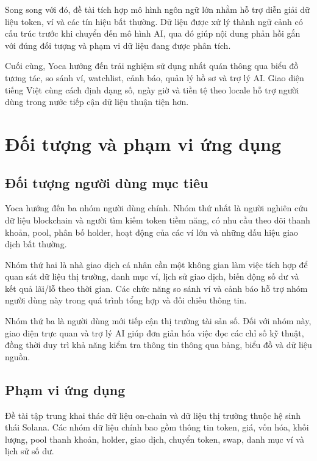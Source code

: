 Song song với đó, đề tài tích hợp mô hình ngôn ngữ lớn nhằm hỗ trợ diễn giải dữ liệu token, ví và các tín hiệu bất thường. Dữ liệu được xử lý thành ngữ cảnh có cấu trúc trước khi chuyển đến mô hình AI, qua đó giúp nội dung phản hồi gắn với đúng đối tượng và phạm vi dữ liệu đang được phân tích.

Cuối cùng, Yoca hướng đến trải nghiệm sử dụng nhất quán thông qua biểu đồ tương tác, so sánh ví, watchlist, cảnh báo, quản lý hồ sơ và trợ lý AI. Giao diện tiếng Việt cùng cách định dạng số, ngày giờ và tiền tệ theo locale hỗ trợ người dùng trong nước tiếp cận dữ liệu thuận tiện hơn.

\section{Đối tượng và phạm vi ứng dụng}
\label{sec:doi_tuong_pham_vi}

\subsection{Đối tượng người dùng mục tiêu}

Yoca hướng đến ba nhóm người dùng chính. Nhóm thứ nhất là người nghiên cứu dữ liệu blockchain và người tìm kiếm token tiềm năng, có nhu cầu theo dõi thanh khoản, pool, phân bố holder, hoạt động của các ví lớn và những dấu hiệu giao dịch bất thường.

Nhóm thứ hai là nhà giao dịch cá nhân cần một không gian làm việc tích hợp để quan sát dữ liệu thị trường, danh mục ví, lịch sử giao dịch, biến động số dư và kết quả lãi/lỗ theo thời gian. Các chức năng so sánh ví và cảnh báo hỗ trợ nhóm người dùng này trong quá trình tổng hợp và đối chiếu thông tin.

Nhóm thứ ba là người dùng mới tiếp cận thị trường tài sản số. Đối với nhóm này, giao diện trực quan và trợ lý AI giúp đơn giản hóa việc đọc các chỉ số kỹ thuật, đồng thời duy trì khả năng kiểm tra thông tin thông qua bảng, biểu đồ và dữ liệu nguồn.

\subsection{Phạm vi ứng dụng}

Đề tài tập trung khai thác dữ liệu on-chain và dữ liệu thị trường thuộc hệ sinh thái Solana. Các nhóm dữ liệu chính bao gồm thông tin token, giá, vốn hóa, khối lượng, pool thanh khoản, holder, giao dịch, chuyển token, swap, danh mục ví và lịch sử số dư.

